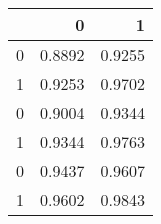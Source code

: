 \begin{tabular}{lrr}
\toprule
{} &       0 &       1 \\
\midrule
0 &  0.8892 &  0.9255 \\
1 &  0.9253 &  0.9702 \\
0 &  0.9004 &  0.9344 \\
1 &  0.9344 &  0.9763 \\
0 &  0.9437 &  0.9607 \\
1 &  0.9602 &  0.9843 \\
\bottomrule
\end{tabular}
